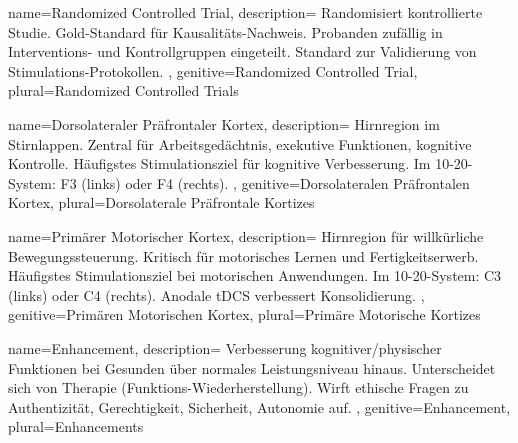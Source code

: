 
{
	name=Randomized Controlled Trial,
	description={
			Randomisiert kontrollierte Studie. Gold-Standard für Kausalitäts-Nachweis. Probanden zufällig in Interventions- und Kontrollgruppen eingeteilt. Standard zur Validierung von Stimulations-Protokollen.
		},
	genitive=Randomized Controlled Trial,
	plural=Randomized Controlled Trials
}



{
	name=Dorsolateraler Präfrontaler Kortex,
	description={
			Hirnregion im Stirnlappen. Zentral für Arbeitsgedächtnis, exekutive Funktionen, kognitive Kontrolle. Häufigstes Stimulationsziel für kognitive Verbesserung. Im 10-20-System: F3 (links) oder F4 (rechts). \cite{hoy_enhancement_2016, woods_technical_2016}
		},
	genitive=Dorsolateralen Präfrontalen Kortex,
	plural=Dorsolaterale Präfrontale Kortizes
}


{
	name=Primärer Motorischer Kortex,
	description={
			Hirnregion für willkürliche Bewegungssteuerung. Kritisch für motorisches Lernen und Fertigkeitserwerb. Häufigstes Stimulationsziel bei motorischen Anwendungen. Im 10-20-System: C3 (links) oder C4 (rechts). Anodale \gls{tDCS} verbessert Konsolidierung. \cite{reis_noninvasive_2009}
		},
	genitive=Primären Motorischen Kortex,
	plural=Primäre Motorische Kortizes
}



{
	name=Enhancement,
	description={
			Verbesserung kognitiver/physischer Funktionen bei Gesunden über normales Leistungsniveau hinaus. Unterscheidet sich von Therapie (Funktions-Wiederherstellung). Wirft ethische Fragen zu Authentizität, Gerechtigkeit, Sicherheit, Autonomie auf.
		},
	genitive=Enhancement,
	plural=Enhancements
}

